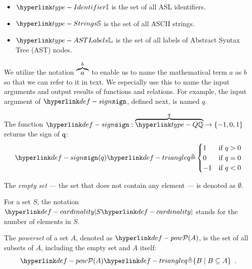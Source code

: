 \begin{itemize}
\item
\hypertarget{type-Identifier}{}
$\Identifier$
is the set of all ASL identifiers.

\item
\hypertarget{type-Strings}{}
$\Strings$
is the set of all ASCII strings.

\item
\hypertarget{type-ASTLabels}{}
$\ASTLabels$
is the set of all labels of Abstract Syntax Tree (AST) nodes.
\end{itemize}

We utilize the notation $\overbrace{a}^{b}$ to enable us to name the mathematical term $a$ as $b$ so that
we can refer to it in text. We especially use this to name the input arguments and
output results of functions and relations. For example, the input argument of $\sign$,
defined next, is named $q$.

\hypertarget{def-sign}{}
\begin{definition}
  The function $\sign : \overname{\Q}{q} \rightarrow \{-1,0,1\}$ returns the sign of $\texttt{q}$:
\[
\sign(q) \triangleq \begin{cases}
  1 & \text{if }q > 0\\
  0 & \text{if }q = 0\\
  -1 & \text{if }q < 0
\end{cases}
\]
\end{definition}

\begin{definition}
  The \emph{empty set} --- the set that does not contain any element --- is denoted as $\emptyset$.
\end{definition}

\hypertarget{def-cardinality}{}
\begin{definition}
  For a set $S$, the notation $\cardinality{S}$ stands for the number of elements in $S$.
\end{definition}

\hypertarget{def-pow}{}
\begin{definition}[Powerset]
The \emph{powerset} of a set $A$, denoted as $\pow{A}$, is the set of all subsets of $A$, including the empty set and $A$ itself:
\[
    \pow{A} \triangleq \{ B \;|\; B \subseteq A\} \enspace.
\]
\end{definition}


